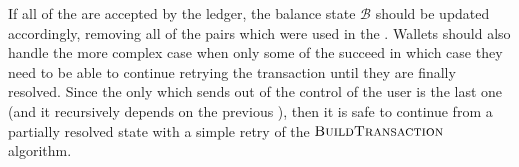 If all of the  are accepted by the ledger, the balance state $\mathcal{B}$ should be updated accordingly, removing all of the pairs which were used in the \Transfer{}. Wallets should also handle the more complex case when only some of the  succeed in which case they need to be able to continue retrying the transaction until they are finally resolved. Since the only \Transfer{} which sends  out of the control of the user is the last one (and it recursively depends on the previous ), then it is safe to continue from a partially resolved state with a simple retry of the $\textsc{BuildTransaction}$ algorithm.
